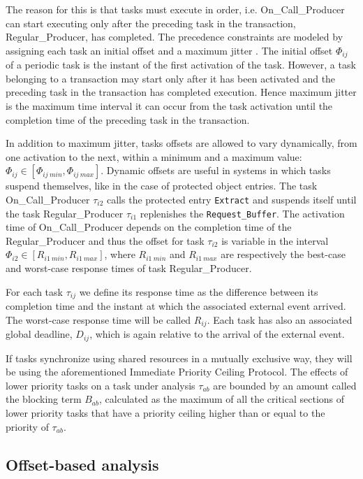 \documentclass{article}
\begin{document}
The reason for this is that tasks must execute in order, i.e. On\_Call\_Producer can start executing only after the preceding task in the transaction, Regular\_Producer, has completed. The precedence constraints are modeled by assigning each task an initial offset and a maximum jitter \cite{tindell-offsets}. The initial offset $\Phi_{ij}$ of a periodic task is the instant of the first activation of the task. However, a task belonging to a transaction may start only after it has been activated and the preceding task in the transaction has completed execution. Hence maximum jitter is the maximum time interval it can occur from the task activation until the completion time of the preceding task in the transaction.

In addition to maximum jitter, tasks offsets are allowed to vary dynamically, from one activation to the next, within a minimum and a maximum value: $\Phi_{ij} \in [\Phi_{ij\ min}, \Phi_{ij\ max}]$. Dynamic offsets are useful in systems in which tasks suspend themselves, like in the case of protected object entries. The task On\_Call\_Producer $\tau_{i2}$ calls the protected entry \texttt{Extract} and suspends itself until the task Regular\_Producer $\tau_{i1}$ replenishes the \texttt{Request\_Buffer}. The activation time of On\_Call\_Producer depends on the completion time of the Regular\_Producer and thus the offset for task $\tau_{i2}$ is variable in the interval $\Phi_{i2} \in [R_{i1\ min}, R_{i1\ max}]$, where $R_{i1\ min}$ and $R_{i1\ max}$ are respectively the best-case and worst-case response times of task Regular\_Producer.

For each task $\tau_{ij}$ we define its response time as the difference between its completion time and the instant at which the associated external event arrived. The worst-case response time will be called $R_{ij}$. Each task has also an associated global deadline, $D_{ij}$, which is again relative to the arrival of the external event.

If tasks synchronize using shared resources in a mutually exclusive way, they will be using the aforementioned Immediate Priority Ceiling Protocol. The effects of lower priority tasks on a task under analysis $\tau_{ab}$ are bounded by an amount called the blocking term $B_{ab}$, calculated as the maximum of all the critical sections of lower priority tasks that have a priority ceiling higher than or equal to the priority of $\tau_{ab}$.

\subsection{Offset-based analysis}
\end{document}
